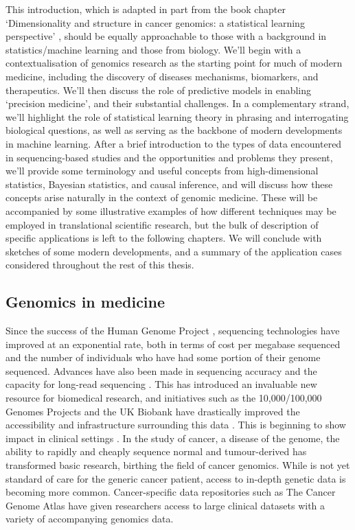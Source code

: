 \documentclass[thesis.tex]{subfiles}
\begin{document}
This introduction, which is adapted in part from the book chapter `Dimensionality and structure in cancer genomics: a statistical learning
perspective' \citep{bradley_dimensionality_2020}, should be equally approachable to those with a background in statistics/machine learning and those from biology. We'll begin with a contextualisation of genomics research as the starting point for much of modern medicine, including the discovery of diseases mechanisms, biomarkers, and therapeutics. We'll then discuss the role of predictive models in enabling `precision medicine', and their substantial challenges. In a complementary strand, we'll highlight the role of statistical learning theory in phrasing and interrogating biological questions, as well as serving as the backbone of modern developments in machine learning. After a brief introduction to the types of data encountered in sequencing-based studies and the opportunities and problems they present, we'll provide some terminology and useful concepts from high-dimensional statistics, Bayesian statistics, and causal inference, and will discuss how these concepts arise naturally in the context of genomic medicine. These will be accompanied by some illustrative examples of how different techniques may be employed in translational scientific research, but the bulk of description of specific applications is left to the following chapters. We will conclude with sketches of some modern developments, and a summary of the application cases considered throughout the rest of this thesis.

\subsection{Genomics in medicine}
Since the success of the Human Genome Project \citep{lander_initial_2001}, sequencing technologies
have improved at an exponential rate, both in terms of cost per megabase
sequenced \citep{wetterstrand_dna_2022} and the number of individuals who have had some portion of
their genome sequenced. Advances have also been made in sequencing accuracy and the capacity for long-read sequencing \citep{goldfeder_human_2017}. This has introduced an invaluable new resource
for biomedical research, and initiatives such as the 10,000/100,000 Genomes Projects \citep{telenti_deep_2016} and the UK Biobank \citep{bycroft_uk_2018} have drastically improved the accessibility and infrastructure surrounding this data \citep{szustakowski_advancing_2021}. This is beginning to show impact in clinical settings \citep{prokop_genome_2018}. In the study of cancer, a disease of the
genome, the ability to rapidly and cheaply sequence normal and tumour-derived  has transformed basic research, birthing the field of cancer
genomics. While  is not yet standard of care for the generic cancer patient,
access to in-depth genetic data is becoming more common. Cancer-specific data repositories such as The Cancer Genome Atlas \citep{weinstein_cancer_2013} have given
researchers access to large clinical datasets with a variety of accompanying
genomics data. 
\end{document}
